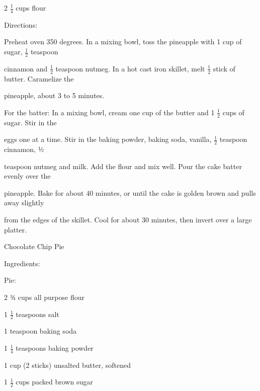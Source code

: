 \documentclass[a4paper,portrait,12pt]{book}
\begin{document}
2 $\frac{1}{4}$ cups flour




Directions:




Preheat oven 350 degrees. In a mixing bowl, toss the pineapple with 1 cup of sugar, $\frac{1}{2}$ teaspoon




cinnamon and $\frac{1}{2}$ teaspoon nutmeg. In a hot cast iron skillet, melt $\frac{1}{2}$ stick of butter. Caramelize the




pineapple, about 3 to 5 minutes.




For the batter: In a mixing bowl, cream one cup of the butter and 1 $\frac{1}{2}$ cups of sugar. Stir in the




eggs one at a time. Stir in the baking powder, baking soda, vanilla, $\frac{1}{2}$ teaspoon cinnamon, ½




teaspoon nutmeg and milk. Add the flour and mix well. Pour the cake batter evenly over the




pineapple. Bake for about 40 minutes, or until the cake is golden brown and pulls away slightly




from the edges of the skillet. Cool for about 30 minutes, then invert over a large platter.







\newpage
Chocolate Chip Pie




Ingredients:




Pie:




2 ¾ cups all purpose flour




1 $\frac{1}{2}$ teaspoons salt




1 teaspoon baking soda




1 $\frac{1}{4}$ teaspoons baking powder




1 cup (2 sticks) unsalted butter, softened




1 $\frac{1}{2}$ cups packed brown sugar
\end{document}
